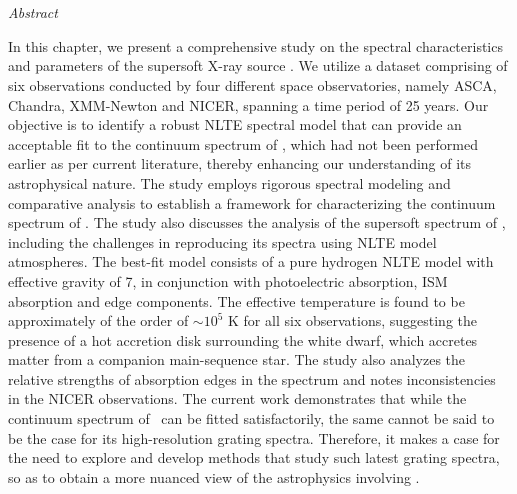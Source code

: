 \chapter{\MakeUppercase{\ChapterTitleThree}} \label{chap:multi-obs}
    \minitoc
    
    \newpage
    \begin{center}
    	\emph{Abstract}
    \end{center}
    
    In this chapter, we present a comprehensive study on the spectral characteristics and parameters of the supersoft X-ray source \source. We utilize a dataset comprising of six observations conducted by four different space observatories, namely ASCA, Chandra, XMM-Newton and NICER, spanning a time period of 25 years. Our objective is to identify a robust NLTE spectral model that can provide an acceptable fit to the continuum spectrum of \source, which had not been performed earlier as per current literature, thereby enhancing our understanding of its astrophysical nature. The study employs rigorous spectral modeling and comparative analysis to establish a framework for characterizing the continuum spectrum of \source. The study also discusses the analysis of the supersoft spectrum of \source, including the challenges in reproducing its spectra using NLTE model atmospheres. The best-fit model consists of a pure hydrogen NLTE model with effective gravity of 7, in conjunction with photoelectric absorption, ISM absorption and edge components. The effective temperature is found to be approximately of the order of $\sim 10^5$ K for all six observations, suggesting the presence of a hot accretion disk surrounding the white dwarf, which accretes matter from a companion main-sequence star. The study also analyzes the relative strengths of absorption edges in the spectrum and notes inconsistencies in the NICER observations. {The current work demonstrates that while the continuum spectrum of \source\ can be fitted satisfactorily, the same cannot be said to be the case for its high-resolution grating spectra. Therefore, it makes a case for the need to explore and develop methods that study such latest grating spectra, so as to obtain a more nuanced view of the astrophysics involving \source.}
    
